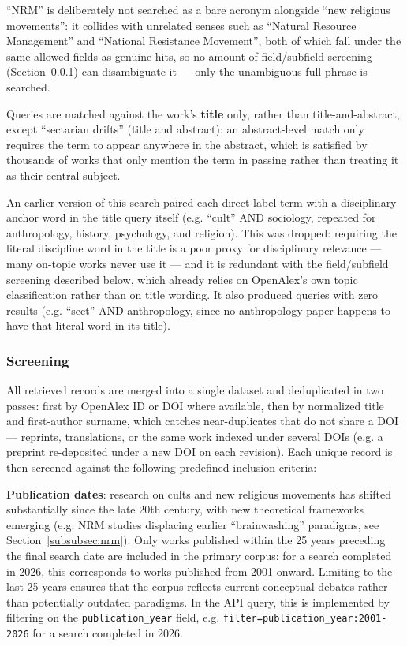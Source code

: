 \enquote{NRM} is deliberately not searched as a bare acronym alongside \enquote{new religious movements}: it collides with unrelated senses such as \enquote{Natural Resource Management} and \enquote{National Resistance Movement}, both of which fall under the same allowed fields as genuine hits, so no amount of field/subfield screening (Section~\ref{sec:screening}) can disambiguate it — only the unambiguous full phrase is searched.

Queries are matched against the work's \textbf{title} only, rather than title-and-abstract, except \enquote{sectarian drifts} (title and abstract): an abstract-level match only requires the term to appear anywhere in the abstract, which is satisfied by thousands of works that only mention the term in passing rather than treating it as their central subject.

An earlier version of this search paired each direct label term with a disciplinary anchor word in the title query itself (e.g. \enquote{cult} AND sociology, repeated for anthropology, history, psychology, and religion). This was dropped: requiring the literal discipline word in the title is a poor proxy for disciplinary relevance — many on-topic works never use it — and it is redundant with the field/subfield screening described below, which already relies on OpenAlex's own topic classification rather than on title wording. It also produced queries with zero results (e.g. \enquote{sect} AND anthropology, since no anthropology paper happens to have that literal word in its title).

\subsubsection{Screening}
\label{sec:screening}
All retrieved records are merged into a single dataset and deduplicated in two passes: first by OpenAlex ID or DOI where available, then by normalized title and first-author surname, which catches near-duplicates that do not share a DOI — reprints, translations, or the same work indexed under several DOIs (e.g. a preprint re-deposited under a new DOI on each revision). Each unique record is then screened against the following predefined inclusion criteria:

\textbf{Publication dates}: research on cults and new religious movements has shifted substantially since the late 20th century, with new theoretical frameworks emerging (e.g. NRM studies displacing earlier \enquote{brainwashing} paradigms, see Section~\ref{subsubsec:nrm}). Only works published within the 25 years preceding the final search date are included in the primary corpus: for a search completed in 2026, this corresponds to works published from 2001 onward. Limiting to the last 25 years ensures that the corpus reflects current conceptual debates rather than potentially outdated paradigms. In the API query, this is implemented by filtering on the \texttt{publication\_year} field, e.g. \verb+filter=publication_year:2001-2026+ for a search completed in 2026.

